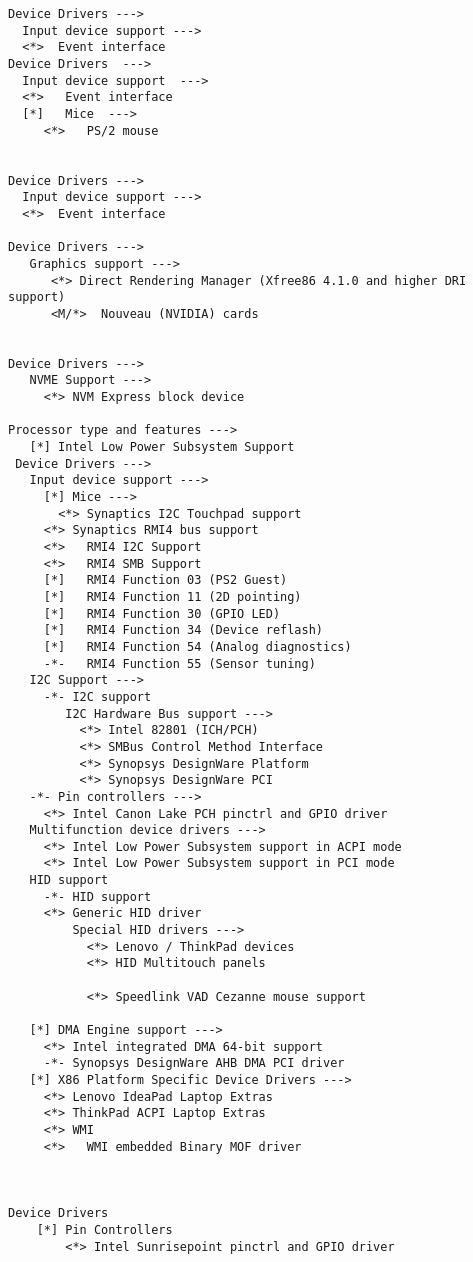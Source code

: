 \documentclass[10pt, a4paper, onecolumn, openany]{book}         %
\begin{document}
\begin{Verbatim}[commandchars=\\\{\}]
Device Drivers --->
  Input device support --->
  <*>  Event interface
Device Drivers  --->
  Input device support  --->
  <*>   Event interface
  [*]   Mice  --->
     <*>   PS/2 mouse   


Device Drivers --->
  Input device support --->
  <*>  Event interface
  
Device Drivers --->
   Graphics support --->
      <*> Direct Rendering Manager (Xfree86 4.1.0 and higher DRI support)
      <M/*>  Nouveau (NVIDIA) cards     
      
      
Device Drivers --->
   NVME Support --->
     <*> NVM Express block device

Processor type and features --->
   [*] Intel Low Power Subsystem Support
 Device Drivers --->
   Input device support --->
     [*] Mice --->
       <*> Synaptics I2C Touchpad support
     <*> Synaptics RMI4 bus support
     <*>   RMI4 I2C Support
     <*>   RMI4 SMB Support
     [*]   RMI4 Function 03 (PS2 Guest)
     [*]   RMI4 Function 11 (2D pointing)
     [*]   RMI4 Function 30 (GPIO LED)
     [*]   RMI4 Function 34 (Device reflash)
     [*]   RMI4 Function 54 (Analog diagnostics)
     -*-   RMI4 Function 55 (Sensor tuning)
   I2C Support --->
     -*- I2C support
        I2C Hardware Bus support --->
          <*> Intel 82801 (ICH/PCH)
          <*> SMBus Control Method Interface
          <*> Synopsys DesignWare Platform
          <*> Synopsys DesignWare PCI
   -*- Pin controllers --->
     <*> Intel Canon Lake PCH pinctrl and GPIO driver
   Multifunction device drivers --->
     <*> Intel Low Power Subsystem support in ACPI mode
     <*> Intel Low Power Subsystem support in PCI mode
   HID support
     -*- HID support
     <*> Generic HID driver
         Special HID drivers --->
           <*> Lenovo / ThinkPad devices
           <*> HID Multitouch panels
           
           <*> Speedlink VAD Cezanne mouse support
           
   [*] DMA Engine support --->
     <*> Intel integrated DMA 64-bit support
     -*- Synopsys DesignWare AHB DMA PCI driver
   [*] X86 Platform Specific Device Drivers --->
     <*> Lenovo IdeaPad Laptop Extras
     <*> ThinkPad ACPI Laptop Extras
     <*> WMI
     <*>   WMI embedded Binary MOF driver    
     
     
     
Device Drivers 
    [*] Pin Controllers
        <*> Intel Sunrisepoint pinctrl and GPIO driver

\end{Verbatim}
\end{document}
